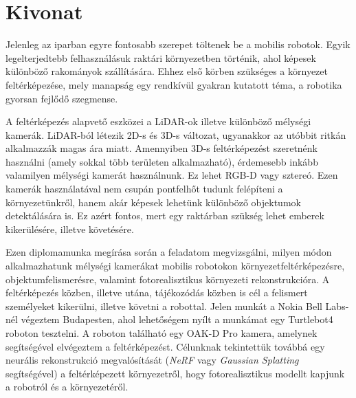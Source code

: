 \setcounter{page}{1}

\selecthungarian

\chapter*{Kivonat}

Jelenleg az iparban egyre fontosabb szerepet töltenek be a mobilis robotok. Egyik legelterjedtebb felhasználásuk raktári környezetben történik, ahol képesek különböző rakományok szállítására. Ehhez első körben szükséges a környezet feltérképezése, mely manapság egy rendkívül gyakran kutatott téma, a robotika gyorsan fejlődő szegmense.

A feltérképezés alapvető eszközei a LiDAR-ok illetve különböző mélységi kamerák. LiDAR-ból létezik 2D-s és 3D-s változat, ugyanakkor az utóbbit ritkán alkalmazzák magas ára miatt. Amennyiben 3D-s feltérképezést szeretnénk használni (amely sokkal több területen alkalmazható), érdemesebb inkább valamilyen mélységi kamerát használnunk. Ez lehet RGB-D vagy sztereó. Ezen kamerák használatával nem csupán pontfelhőt tudunk felépíteni a környezetünkről, hanem akár képesek lehetünk különböző objektumok detektálására is. Ez azért fontos, mert egy raktárban szükség lehet emberek kikerülésére, illetve követésére.

Ezen diplomamunka megírása során a feladatom megvizsgálni, milyen módon alkalmazhatunk mélységi kamerákat mobilis robotokon környezetfeltérképezésre,  objektumfelismerésre, valamint fotorealisztikus környezeti rekonstrukcióra. A feltérképezés közben, illetve utána,  tájékozódás közben is cél a felismert személyeket kikerülni, illetve követni a robottal. Jelen munkát a Nokia Bell Labs-nél végeztem Budapesten, ahol lehetőségem nyílt a munkámat egy Turtlebot4 roboton tesztelni. A roboton található egy OAK-D Pro kamera, amelynek segítségével elvégeztem a feltérképezést. Célunknak tekintettük továbbá egy neurális rekonstrukció megvalósítását (\textit{NeRF} vagy \textit{Gaussian Splatting} segítségével) a feltérképezett környezetről, hogy fotorealisztikus modellt kapjunk a robotról és a környezetéről.


\vfill
\selectenglish


